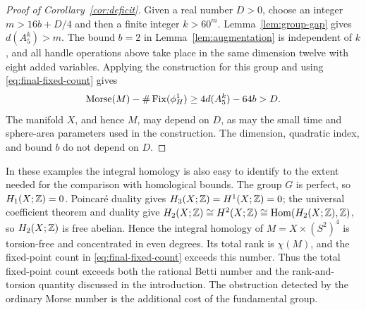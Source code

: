 \begin{proof}[Proof of Corollary~\ref{cor:deficit}]
Given a real number $D>0$, choose an integer
$m>16b+D/4$ and then a finite integer $k>60^m$.
Lemma~\ref{lem:group-gap} gives $d(A_5^k)>m$.
The bound $b=2$ in Lemma~\ref{lem:augmentation} is independent of
$k$, and all handle operations above take place in the same
dimension twelve with eight added variables.  Applying the
construction for this group and using \eqref{eq:final-fixed-count}
gives
\[
 \operatorname{Morse}(M)-\#\operatorname{Fix}(\phi_H^1)
 \geq4d(A_5^k)-64b>D.
\]
The manifold $X$, and hence $M$, may depend on $D$, as may the
small time and sphere-area parameters used in the construction.
The dimension, quadratic index, and bound $b$ do not depend on $D$.
\end{proof}

In these examples the integral homology is also easy to identify
to the extent needed for the comparison with homological bounds.
The group $G$ is perfect, so $H_1(X;\mathbb Z)=0$.
Poincar\'e duality gives $H_3(X;\mathbb Z)=H^1(X;\mathbb Z)=0$;
the universal coefficient theorem and duality give
$H_2(X;\mathbb Z)\cong H^2(X;\mathbb Z)\cong\operatorname{Hom}(H_2(X;\mathbb Z),\mathbb Z)$,
so $H_2(X;\mathbb Z)$ is free abelian.  Hence the integral homology of
$M=X\times(S^2)^4$ is torsion-free and concentrated in even degrees.
Its total rank is $\chi(M)$, and the fixed-point count in
\eqref{eq:final-fixed-count} exceeds this number.  Thus the total
fixed-point count exceeds both the rational Betti number and the
rank-and-torsion quantity discussed in the introduction.
The obstruction detected by the
ordinary Morse number is the additional cost of the fundamental group.
